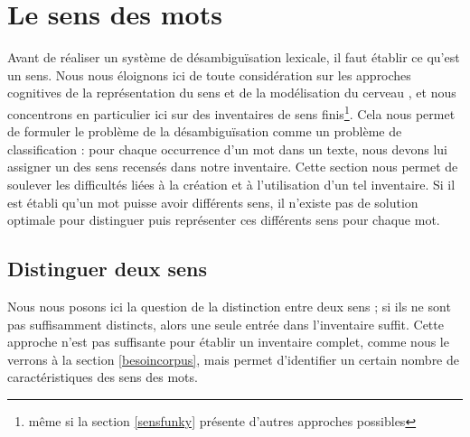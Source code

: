 

\section{Le sens des mots}

Avant de réaliser un système de désambiguïsation lexicale, il faut établir ce qu'est un sens. Nous nous éloignons ici de toute considération sur les approches cognitives de la représentation du sens et de la modélisation du cerveau \citep{harnad1990symbol}, et nous concentrons en particulier ici sur des inventaires de sens finis\footnote{même si la section \ref{sensfunky} présente d'autres approches possibles}. Cela nous permet de formuler le problème de la désambiguïsation comme un problème de classification : pour chaque occurrence d'un mot dans un texte, nous devons lui assigner un des sens recensés dans notre inventaire. Cette section nous permet de soulever les difficultés liées à la création et à l'utilisation d'un tel inventaire. Si il est établi qu'un mot puisse avoir différents sens, il n'existe pas de solution optimale pour distinguer puis représenter ces différents sens pour chaque mot.

%

\subsection{Distinguer deux sens}

Nous nous posons ici la question de la distinction entre deux sens ; si ils ne sont pas suffisamment distincts, alors une seule entrée dans l'inventaire suffit. Cette approche n'est pas suffisante pour établir un inventaire complet, comme nous le verrons à la section \ref{besoincorpus}, mais permet d'identifier un certain nombre de caractéristiques des sens des mots.

